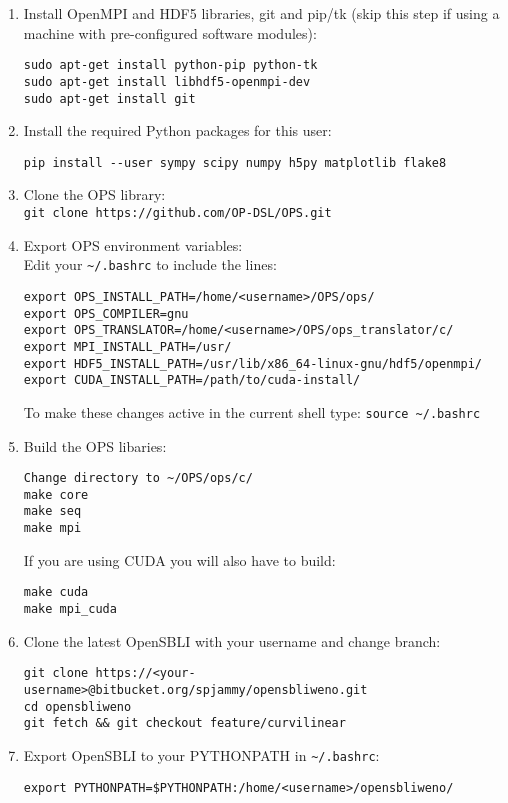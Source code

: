 \documentclass[11pt]{article}
\begin{document}
\begin{enumerate}
\item{Install OpenMPI and HDF5 libraries, git and pip/tk (skip this step if using a machine with pre-configured software modules):
\begin{verbatim}
sudo apt-get install python-pip python-tk
sudo apt-get install libhdf5-openmpi-dev
sudo apt-get install git
\end{verbatim}}
\item{Install the required Python packages for this user:}
\begin{verbatim}
pip install --user sympy scipy numpy h5py matplotlib flake8
\end{verbatim}
\item{Clone the OPS library:\\ \verb|git clone https://github.com/OP-DSL/OPS.git|}
\item{Export OPS environment variables:\\ Edit your \verb|~/.bashrc| to include the lines:}
\begin{verbatim}
export OPS_INSTALL_PATH=/home/<username>/OPS/ops/
export OPS_COMPILER=gnu
export OPS_TRANSLATOR=/home/<username>/OPS/ops_translator/c/
export MPI_INSTALL_PATH=/usr/
export HDF5_INSTALL_PATH=/usr/lib/x86_64-linux-gnu/hdf5/openmpi/
export CUDA_INSTALL_PATH=/path/to/cuda-install/
\end{verbatim}
To make these changes active in the current shell type: \verb|source ~/.bashrc|
\item{Build the OPS libaries:}
\begin{verbatim}
Change directory to ~/OPS/ops/c/
make core
make seq
make mpi
\end{verbatim}
If you are using CUDA you will also have to build:
\begin{verbatim}
make cuda
make mpi_cuda
\end{verbatim}

\item{Clone the latest OpenSBLI with your username and change branch:}
\begin{verbatim}
git clone https://<your-username>@bitbucket.org/spjammy/opensbliweno.git
cd opensbliweno
git fetch && git checkout feature/curvilinear
\end{verbatim}

\item{Export OpenSBLI to your PYTHONPATH in \verb|~/.bashrc|:}
\begin{verbatim}
export PYTHONPATH=$PYTHONPATH:/home/<username>/opensbliweno/
\end{verbatim}


\end{enumerate}
\end{document}
